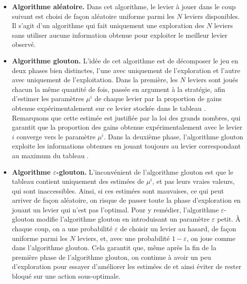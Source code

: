 \documentclass[a4paper,12pt]{article}
\begin{document}
\begin{itemize}[label=\textbullet, leftmargin=*]
\item \textbf{Algorithme aléatoire.} Dans cet algorithme, le levier à jouer dans le coup suivant est choisi de façon aléatoire uniforme parmi les $N$ leviers disponibles. Il s'agit d'un algorithme qui fait uniquement une exploration des $N$ leviers sans utiliser aucune information obtenue pour exploiter le meilleur levier observé.

\item \textbf{Algorithme glouton.} L'idée de cet algorithme est de décomposer le jeu en deux phases bien distinctes, l'une avec uniquement de l'exploration et l'autre avec uniquement de l'exploitation. Dans la première, les $N$ leviers sont joués chacun la même quantité de fois, passée en argument à la stratégie, afin d'estimer les paramètres $\mu^i$ de chaque levier par la proportion de gains obtenue expérimentalement sur ce levier stockée dans le tableau \verb@mu@. Remarquons que cette estimée est justifiée par la loi des grands nombres, qui garantit que la proportion des gains obtenue expérimentalement avec le levier $i$ converge vers le paramètre $\mu^i$. Dans la deuxième phase, l'algorithme glouton exploite les informations obtenues en jouant toujours au levier correspondant au maximum du tableau \verb@mu@.

\item \textbf{Algorithme $\varepsilon$-glouton.} L'inconvénient de l'algorithme glouton est que le tableau \verb@mu@ contient uniquement des estimées de $\mu^i$, et pas leurs vraies valeurs, qui sont inaccessibles. Ainsi, si ces estimées sont mauvaises, ce qui peut arriver de façon aléatoire, on risque de passer toute la phase d'exploration en jouant un levier qui n'est pas l'optimal. Pour y remédier, l'algorithme $\varepsilon$-glouton modifie l'algorithme glouton en introduisant un paramètre $\varepsilon$ petit. À chaque coup, on a une probabilité $\varepsilon$ de choisir un levier au hasard, de façon uniforme parmi les $N$ leviers, et, avec une probabilité $1 - \varepsilon$, on joue comme dans l'algorithme glouton. Cela garantit que, même après la fin de la première phase de l'algorithme glouton, on continue à avoir un peu d'exploration pour essayer d'améliorer les estimées de \verb@mu@ et ainsi éviter de rester bloqué sur une action sous-optimale.


\end{itemize}
\end{document}
